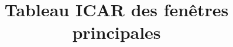 

\addtolength{\oddsidemargin}{-1cm}
\addtolength{\evensidemargin}{-1cm}
\title{Tableau ICAR des fenêtres principales}

\maketitle


 

